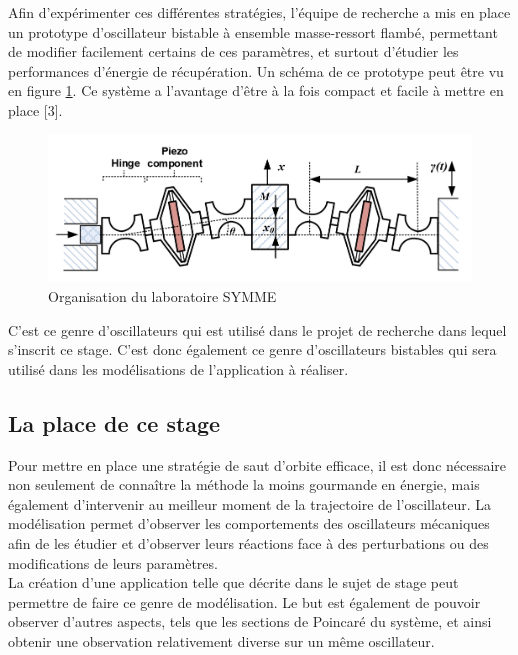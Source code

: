 \documentclass[a4paper, french, 12pt, titlepage]{article}
\begin{document}
Afin d'expérimenter ces différentes stratégies, l'équipe de recherche a mis en place un prototype d'oscillateur bistable à ensemble masse-ressort flambé, permettant de modifier facilement certains de ces paramètres, et surtout d'étudier les performances d'énergie de récupération. 
Un schéma de ce prototype peut être vu en figure \ref{fig:prototype}. 
Ce système a l'avantage d'être à la fois compact et facile à mettre en place [3]. \\


\begin{figure}[H]
  \includegraphics[width=\linewidth]{prototype.png}
  \caption{Organisation du laboratoire SYMME}
  \label{fig:prototype}
\end{figure}

C'est ce genre d'oscillateurs qui est utilisé dans le projet de recherche dans lequel s'inscrit ce stage.
 C'est donc également ce genre d'oscillateurs bistables qui sera utilisé dans les modélisations de l'application à réaliser.\\

\subsection{La place de ce stage}

Pour mettre en place une stratégie de saut d'orbite efficace, il est donc nécessaire non seulement de connaître la méthode la moins gourmande en énergie, mais également d'intervenir au meilleur moment de la trajectoire de l'oscillateur.
 La modélisation permet d'observer les comportements des oscillateurs mécaniques afin de les étudier et d'observer leurs réactions face à des perturbations ou des modifications de leurs paramètres.
  \\

La création d'une application telle que décrite dans le sujet de stage peut permettre de faire ce genre de modélisation.
 Le but est également de pouvoir observer d'autres aspects, tels que les sections de Poincaré du système, et ainsi obtenir une observation relativement diverse sur un même oscillateur. \\
\end{document}
